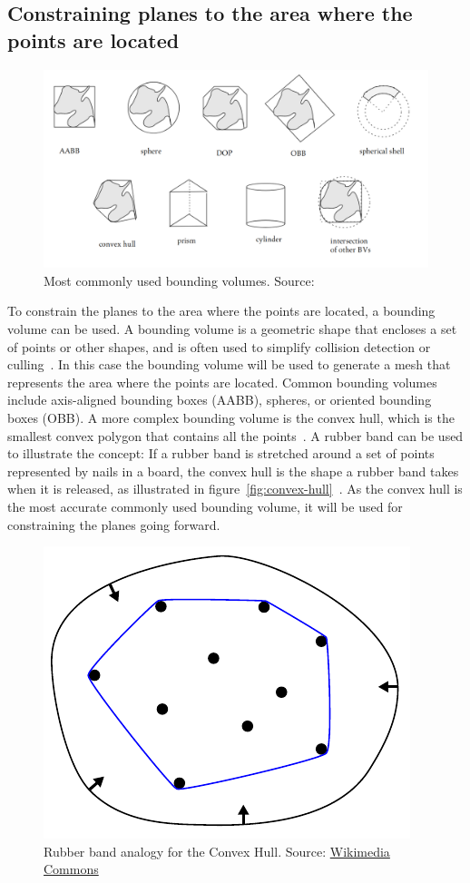 \subsection{Constraining planes to the area where the points are located}

\begin{figure}[ht!]
    \centering
    \includegraphics[width=0.9\linewidth]{images/bounding-volumes}
    \caption{Most commonly used bounding volumes. Source: \cite{gabriel_zachmann_geometric_2002}}
\end{figure}

To constrain the planes to the area where the points are located, a bounding volume can be used.
A bounding volume is a geometric shape that encloses a set of points or other shapes,
and is often used to simplify collision detection or culling~\cite{gabriel_zachmann_geometric_2002}.
In this case the bounding volume will be used to generate a mesh that represents the area where the points are located.
Common bounding volumes include axis-aligned bounding boxes (AABB), spheres, or oriented bounding boxes (OBB).
A more complex bounding volume is the convex hull, which is the smallest convex polygon that contains all the points~\cite{gabriel_zachmann_geometric_2002}.
A rubber band can be used to illustrate the concept: If a rubber band is stretched around a set of points represented by nails in a board,
the convex hull is the shape a rubber band takes when it is released, as illustrated in figure~\ref{fig:convex-hull}~\cite{de_berg_computational_2008}.
As the convex hull is the most accurate commonly used bounding volume,
it will be used for constraining the planes going forward.

\begin{figure}[ht!]
    \centering
    \includegraphics[width=0.25\linewidth]{images/ConvexHull}
    \caption{Rubber band analogy for the Convex Hull. Source: \href{https://commons.wikimedia.org/wiki/File:ConvexHull.svg}{Wikimedia Commons}}
\end{figure}

